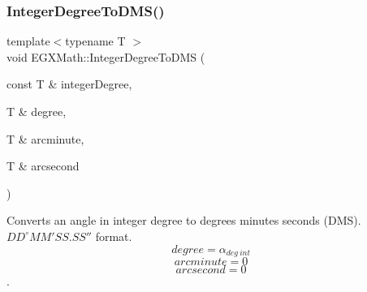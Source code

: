 \mbox{\label{group___e_g_x_math-_angle_conversions-_integer_degree_gaf76779bcc23268b41d4c3a7610d60eaf}} 
\subsubsection{\texorpdfstring{Integer\+Degree\+To\+D\+M\+S()}{IntegerDegreeToDMS()}}
{\footnotesize\ttfamily template$<$typename T $>$ \\
void E\+G\+X\+Math\+::\+Integer\+Degree\+To\+D\+MS (\begin{DoxyParamCaption}\item[{const T \&}]{integer\+Degree,  }\item[{T \&}]{degree,  }\item[{T \&}]{arcminute,  }\item[{T \&}]{arcsecond }\end{DoxyParamCaption})}



Converts an angle in integer degree to degrees minutes seconds (D\+MS). ${DD}^{\circ}{MM}'{SS.SS}''$ format. \[degree=\alpha_{deg\ int}\] \[arcminute= 0\] \[arcsecond= 0\]. 


